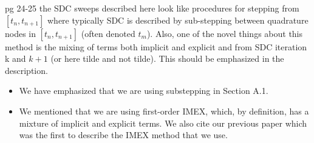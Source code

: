 \documentclass[12pt]{article}
\newcommand{\comment}[1]{{\color{blue} #1}}
\begin{document}
\comment{pg 24-25 the SDC sweeps described here look like procedures for
stepping from $[t_{n}, t_{n+1}]$ where typically SDC is described by
sub-stepping between quadrature nodes in $[t_{n}, t_{n+1}]$ (often
denoted $t_{m}$).  Also, one of the novel things about this method is
the mixing of terms both implicit and explicit and from SDC iteration k
and $k+1$ (or here tilde and not tilde). This should be emphasized in
the description.}
\begin{itemize}
  \item We have emphasized that we are using substepping in Section A.1.
  \item We mentioned that we are using first-order IMEX, which, by
  definition, has a mixture of implicit and explicit terms.  We also
  cite our previous paper which was the first to describe the IMEX
  method that we use.
\end{itemize}
\end{document}
